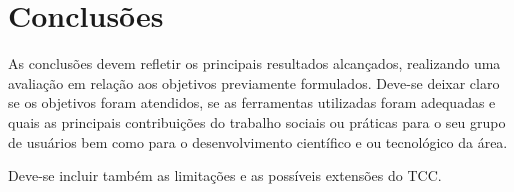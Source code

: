 \section{Conclusões}\label{sec:conclusoes}

As conclusões devem refletir os principais resultados alcançados,
realizando uma avaliação em relação aos objetivos previamente
formulados. Deve-se deixar claro se os objetivos foram atendidos, se as
ferramentas utilizadas foram adequadas e quais as principais
contribuições do trabalho sociais ou práticas para o seu grupo de
usuários bem como para o desenvolvimento científico e ou tecnológico da
área.

Deve-se incluir também as limitações e as possíveis extensões do TCC.
